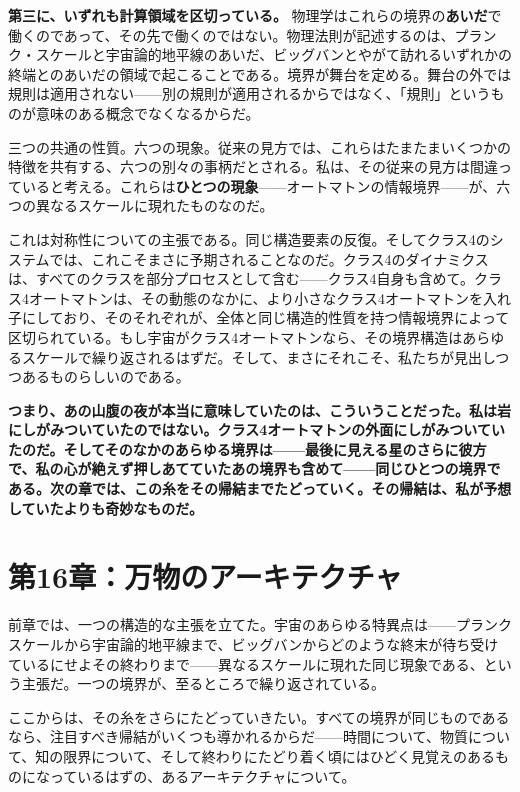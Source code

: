 \documentclass[11pt, twoside, openright]{book}
\begin{document}
\textbf{第三に、いずれも計算領域を区切っている。} 物理学はこれらの境界の\textbf{あいだ}で働くのであって、その先で働くのではない。物理法則が記述するのは、プランク・スケールと宇宙論的地平線のあいだ、ビッグバンとやがて訪れるいずれかの終端とのあいだの領域で起こることである。境界が舞台を定める。舞台の外では規則は適用されない------別の規則が適用されるからではなく、「規則」というものが意味のある概念でなくなるからだ。

三つの共通の性質。六つの現象。従来の見方では、これらはたまたまいくつかの特徴を共有する、六つの別々の事柄だとされる。私は、その従来の見方は間違っていると考える。これらは\textbf{ひとつの現象}------オートマトンの情報境界------が、六つの異なるスケールに現れたものなのだ。

これは対称性についての主張である。同じ構造要素の反復。そしてクラス4のシステムでは、これこそまさに予期されることなのだ。クラス4のダイナミクスは、すべてのクラスを部分プロセスとして含む------クラス4自身も含めて。クラス4オートマトンは、その動態のなかに、より小さなクラス4オートマトンを入れ子にしており、そのそれぞれが、全体と同じ構造的性質を持つ情報境界によって区切られている。もし宇宙がクラス4オートマトンなら、その境界構造はあらゆるスケールで繰り返されるはずだ。そして、まさにそれこそ、私たちが見出しつつあるものらしいのである。


\textbf{つまり、あの山腹の夜が本当に意味していたのは、こういうことだった。私は岩にしがみついていたのではない。クラス4オートマトンの外面にしがみついていたのだ。そしてそのなかのあらゆる境界は------最後に見える星のさらに彼方で、私の心が絶えず押しあてていたあの境界も含めて------同じひとつの境界である。次の章では、この糸をその帰結までたどっていく。その帰結は、私が予想していたよりも奇妙なものだ。}


\chapter*{第16章：万物のアーキテクチャ}

前章では、一つの構造的な主張を立てた。宇宙のあらゆる特異点は------プランクスケールから宇宙論的地平線まで、ビッグバンからどのような終末が待ち受けているにせよその終わりまで------異なるスケールに現れた同じ現象である、という主張だ。一つの境界が、至るところで繰り返されている。

ここからは、その糸をさらにたどっていきたい。すべての境界が同じものであるなら、注目すべき帰結がいくつも導かれるからだ------時間について、物質について、知の限界について、そして終わりにたどり着く頃にはひどく見覚えのあるものになっているはずの、あるアーキテクチャについて。
\end{document}
